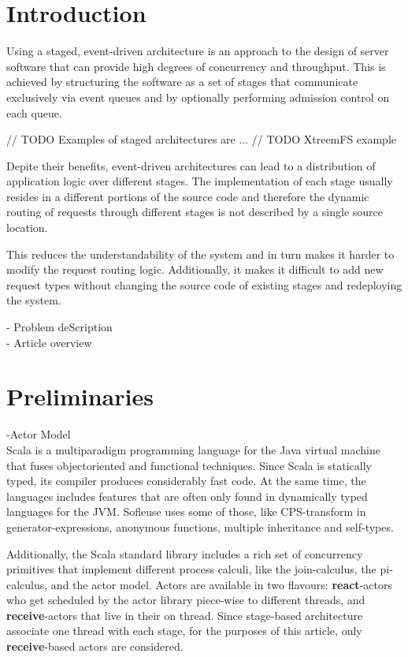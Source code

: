 \documentclass{sig-alternate}
\begin{document}
\section{Introduction}             

Using a staged, event-driven architecture is an approach to the design of server software that can 
provide high degrees of concurrency and throughput.  This is achieved by structuring the software as
a set of stages that communicate exclusively via event queues and by optionally performing admission 
control on each queue.  

// TODO Examples of staged architectures are ...
// TODO XtreemFS example

Depite their benefits, event-driven architectures can lead to a distribution of application logic
over different stages. The implementation of each stage usually resides in a different portions of
the source code and therefore the dynamic routing of requests through different stages is not
described by a single source location.

This reduces the understandability of the system and in turn makes it harder to modify the request
routing logic. Additionally, it makes it difficult to add new request types without changing the
source code of existing stages and redeploying the system.

- Problem deScription\\

- Article overview\\
                                
                         
\section{Preliminaries}

-Actor Model \\

Scala is a multiparadigm programming language for the Java virtual machine that fuses objectoriented
and functional techniques. Since Scala is statically typed, its compiler produces considerably fast
code. At the same time, the languages includes features that are often only found in dynamically
typed languages for the JVM. Sofleuse uses some of those, like CPS-transform in
generator-expressions, anonymous functions, multiple inheritance and self-types.

Additionally, the Scala standard library includes a rich set of concurrency primitives that
implement different process calculi, like the join-calculus, the pi-calculus, and the actor model.
Actors are available in two flavours: \textbf{react}-actors who get scheduled by the actor library
piece-wise to different threads, and \textbf{receive}-actors that live in their on thread. Since
stage-based architecture associate one thread with each stage, for the purposes of this article, 
only \textbf{receive}-based actors are considered.
\end{document}
